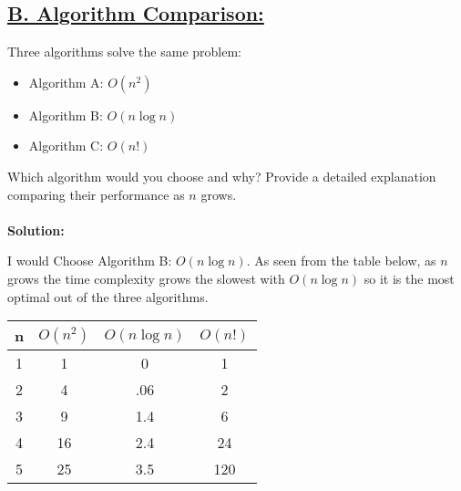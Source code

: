 \documentclass{article}
\begin{document}
\subsection*{\underline{B. Algorithm Comparison:}}
Three algorithms solve the same problem:
\begin{itemize}
    \item Algorithm A: \(O(n^2)\)
    \item Algorithm B: \(O(n\log n)\)
    \item Algorithm C: \(O(n!)\)
\end{itemize}
Which algorithm would you choose and why? Provide a detailed explanation comparing their performance as \(n\) grows.\\ \\
\textbf{Solution:}
\begin{myindentpar}{.5cm}
    I would Choose Algorithm B: \(O(n\log n)\). As seen from the table below, as \(n\) grows the time complexity grows the slowest with \(O(n\log n)\) so it is the most optimal out of the three algorithms. 
\end{myindentpar}
\begin{center}
    \begin{tabular}{|c||c|c|c|}
    \hline
    n&\(O(n^2)\)&\(O(n\log n)\) &\(O(n!)\) \\ [0,5ex]
    \hline
    1 & 1 & 0 & 1 \\
    2 & 4 & .06 & 2 \\
    3 & 9 & 1.4 & 6 \\ 
    4 & 16 & 2.4 & 24 \\
    5 & 25 & 3.5 & 120 \\
    \hline
    
    
    \end{tabular}
\end{center}
\end{document}
